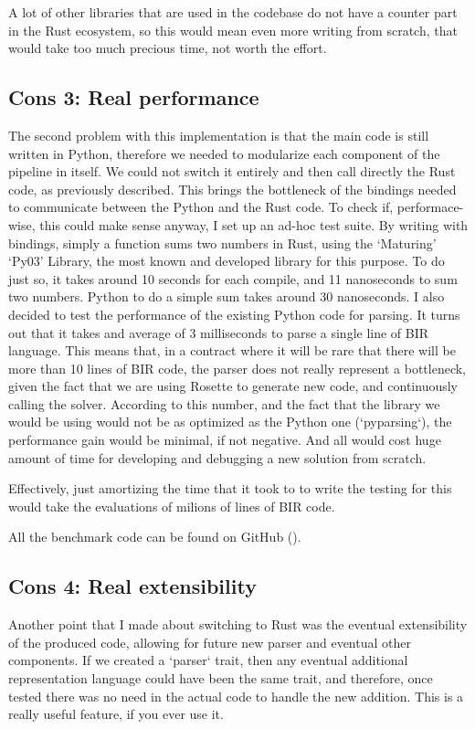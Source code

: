 A lot of other libraries that are used in the codebase do not have a counter
part in the Rust ecosystem, so this would mean even more writing from scratch,
that would take too much precious time, not worth the effort.

\subsection[Real performance]{Cons 3: Real performance}
The second problem with this implementation is that the main code is still written
in Python, therefore we needed to modularize each component of the pipeline in
itself. We could not switch it entirely and then call directly the Rust code, as
previously described. This brings the bottleneck of the bindings needed to communicate
between the Python and the Rust code. To check if, performace-wise, this could
make sense anyway, I set up an ad-hoc test suite. By writing with bindings, simply
a function sums two numbers in Rust, using the `Maturing' `Py03' Library, the most
known and developed library for this purpose. To do just so, it takes around 10 seconds
for each compile, and 11 nanoseconds to sum two numbers. Python to do a simple sum
takes around 30 nanoseconds. I also decided to test the performance of the
existing Python code for parsing. It turns out that it takes and average of 3 milliseconds
to parse a single line of BIR language. This means that, in a contract where it will
be rare that there will be more than 10 lines of BIR code, the parser does not
really represent a bottleneck, given the fact that we are using Rosette to generate
new code, and continuously calling the solver. According to this number, and the
fact that the library we would be using would not be as optimized as the Python
one (`pyparsing`), the performance gain would be minimal, if not negative. And all
would cost huge amount of time for developing and debugging a new solution from scratch.

Effectively, just amortizing the time that it took to to write the testing for
this would take the evaluations of milions of lines of BIR code.

All the benchmark code can be found on GitHub (\cite{benchmark}).

\subsection[Real extensibility]{Cons 4: Real extensibility}
Another point that I made about switching to Rust was the eventual extensibility
of the produced code, allowing for future new parser and eventual other components.
If we created a `parser` trait, then any eventual additional representation language
could have been the same trait, and therefore, once tested there was no need in the
actual code to handle the new addition. This is a really useful feature, if you ever
use it.

